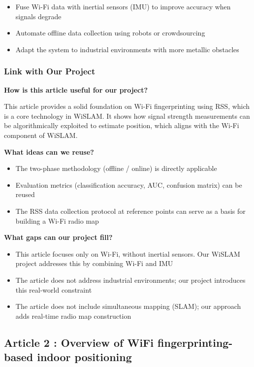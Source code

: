 \documentclass{ipgpmaster}
\begin{document}
\begin{itemize}
    \item Fuse Wi-Fi data with inertial sensors (IMU) to improve accuracy when signals degrade 
    \item Automate offline data collection using robots or crowdsourcing 
    \item Adapt the system to industrial environments with more metallic obstacles 
\end{itemize}
 

\subsubsection{\textbf{Link with Our Project}}

\textbf{How is this article useful for our project?}

 This article provides a solid foundation on Wi-Fi fingerprinting using RSS, which is a core technology in WiSLAM. It shows how signal strength measurements can be algorithmically exploited to estimate position, which aligns with the Wi-Fi component of WiSLAM.

\textbf{What ideas can we reuse?}

\begin{itemize}
    \item The two-phase methodology (offline / online) is directly applicable 
    \item Evaluation metrics (classification accuracy, AUC, confusion matrix) can be reused 
    \item The RSS data collection protocol at reference points can serve as a basis for building a Wi-Fi radio map 
\end{itemize}
\textbf{What gaps can our project fill?}

\begin{itemize}
    \item This article focuses only on Wi-Fi, without inertial sensors. Our WiSLAM project addresses this by combining Wi-Fi and IMU 
    \item The article does not address industrial environments; our project introduces this real-world constraint 
    \item The article does not include simultaneous mapping (SLAM); our approach adds real-time radio map construction 
\end{itemize}

\subsection{Article 2 : Overview of WiFi fingerprinting-based indoor positioning }
\end{document}
